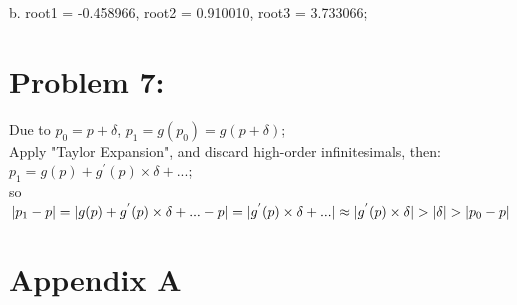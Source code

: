 \documentclass{article}
\begin{document}
b. root1 = -0.458966, root2 = 0.910010, root3 = 3.733066;
\begin{figure}[htbp]
\centering
{}%
%
%
\end{figure}
	 

\section{Problem 7:}     
Due to $p_0=p+\delta$, $p_1=g(p_0)=g(p+\delta)$; \\
Apply "Taylor Expansion", and discard high-order infinitesimals, then: \\
$p_1=g(p)+g^{'}(p)\times \delta+...$; \\
so $|p_1-p|=|g(p)+g^{'}(p)\times \delta+...-p| \\
=|g^{'}(p)\times \delta+...| \\
\approx |g^{'}(p)\times \delta|\\
>|\delta| \\
>|p_0-p|$

\newpage
\appendix
\section{Appendix A}
\end{document}
